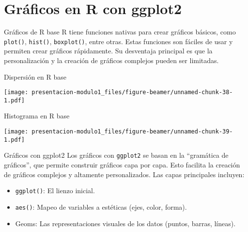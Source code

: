 \documentclass[
  ignorenonframetext,
]{beamer}
\newenvironment{Shaded}{\begin{snugshade}}{\end{snugshade}}
\newcommand{\AttributeTok}[1]{\textcolor[rgb]{0.13,0.29,0.53}{#1}}
\newcommand{\CommentTok}[1]{\textcolor[rgb]{0.56,0.35,0.01}{\textit{#1}}}
\newcommand{\FunctionTok}[1]{\textcolor[rgb]{0.13,0.29,0.53}{\textbf{#1}}}
\newcommand{\NormalTok}[1]{#1}
\newcommand{\SpecialCharTok}[1]{\textcolor[rgb]{0.81,0.36,0.00}{\textbf{#1}}}
\newcommand{\StringTok}[1]{\textcolor[rgb]{0.31,0.60,0.02}{#1}}
\begin{document}
\section{Gráficos en R con ggplot2}\label{gruxe1ficos-en-r-con-ggplot2}

\begin{frame}[fragile]{Gráficos de R base}
\label{gruxe1ficos-de-r-base}
R tiene funciones nativas para crear gráficos básicos, como
\texttt{plot()}, \texttt{hist()}, \texttt{boxplot()}, entre otras. Estas
funciones son fáciles de usar y permiten crear gráficos rápidamente. Su
desventaja principal es que la personalización y la creación de gráficos
complejos pueden ser limitadas.
\end{frame}

\begin{frame}[fragile]{Dispersión en R base}
\label{dispersiuxf3n-en-r-base}
\begin{Shaded}
\end{Shaded}

\texttt{[image: presentacion-modulo1\_files/figure-beamer/unnamed-chunk-38-1.pdf]}
\end{frame}

\begin{frame}[fragile]{Histograma en R base}
\label{histograma-en-r-base}
\begin{Shaded}
\end{Shaded}

\texttt{[image: presentacion-modulo1\_files/figure-beamer/unnamed-chunk-39-1.pdf]}
\end{frame}

\begin{frame}[fragile]{Gráficos con ggplot2}
\label{gruxe1ficos-con-ggplot2}
Los gráficos con \texttt{ggplot2} se basan en la ``gramática de
gráficos'', que permite construir gráficos capa por capa. Esto facilita
la creación de gráficos complejos y altamente personalizados. Las capas
principales incluyen:

\begin{itemize}
\item
  \texttt{ggplot()}: El lienzo inicial.
\item
  \texttt{aes()}: Mapeo de variables a estéticas (ejes, color, forma).
\item
  Geoms: Las representaciones visuales de los datos (puntos, barras,
  líneas).
\end{itemize}
\end{frame}
\end{document}
